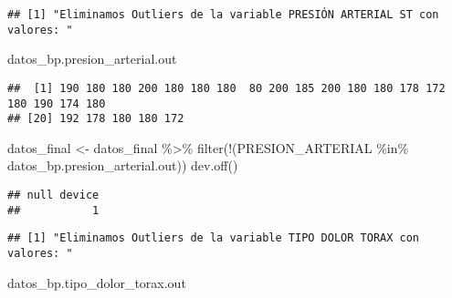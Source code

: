 \documentclass[
]{article}
\newenvironment{Shaded}{\begin{snugshade}}{\end{snugshade}}
\newcommand{\FunctionTok}[1]{\textcolor[rgb]{0.94,0.94,0.56}{#1}}
\newcommand{\NormalTok}[1]{\textcolor[rgb]{0.80,0.80,0.80}{#1}}
\newcommand{\OtherTok}[1]{\textcolor[rgb]{0.94,0.94,0.56}{#1}}
\newcommand{\SpecialCharTok}[1]{\textcolor[rgb]{0.86,0.64,0.64}{#1}}
\newcommand{\StringTok}[1]{\textcolor[rgb]{0.80,0.58,0.58}{#1}}
\begin{document}
\begin{verbatim}
## [1] "Eliminamos Outliers de la variable PRESIÓN ARTERIAL ST con valores: "
\end{verbatim}

\begin{Shaded}
\begin{Highlighting}[]
\NormalTok{datos\_bp.presion\_arterial.out}
\end{Highlighting}
\end{Shaded}

\begin{verbatim}
##  [1] 190 180 180 200 180 180 180  80 200 185 200 180 180 178 172 180 190 174 180
## [20] 192 178 180 180 172
\end{verbatim}

\begin{Shaded}
\begin{Highlighting}[]
\NormalTok{datos\_final }\OtherTok{\textless{}{-}}\NormalTok{ datos\_final }\SpecialCharTok{\%\textgreater{}\%} \FunctionTok{filter}\NormalTok{(}\SpecialCharTok{!}\NormalTok{(PRESION\_ARTERIAL }\SpecialCharTok{\%in\%}\NormalTok{ datos\_bp.presion\_arterial.out))}
\FunctionTok{dev.off}\NormalTok{()}
\end{Highlighting}
\end{Shaded}

\begin{verbatim}
## null device 
##           1
\end{verbatim}

\begin{Shaded}
\end{Shaded}

\begin{verbatim}
## [1] "Eliminamos Outliers de la variable TIPO DOLOR TORAX con valores: "
\end{verbatim}

\begin{Shaded}
\begin{Highlighting}[]
\NormalTok{datos\_bp.tipo\_dolor\_torax.out}
\end{Highlighting}
\end{Shaded}
\end{document}
